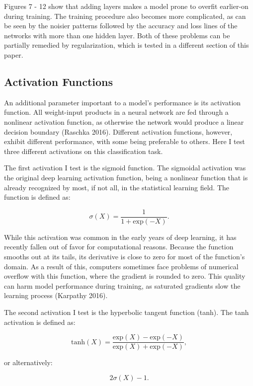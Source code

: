 \documentclass[12pt]{article}  %
\theoremstyle{definition}
\theoremstyle{remark}
\begin{document}
\par  Figures 7 - 12 show that adding layers makes a model prone to overfit earlier-on during training. The training procedure also becomes more complicated, as can be seen by the noisier patterns followed by the accuracy and loss lines of the networks with more than one hidden layer. Both of these problems can be partially remedied by regularization, which is tested in a different section of this paper. 

\subsection{Activation Functions}
\par An additional parameter important to a model's performance is its activation function. All weight-input products in a neural network are fed through a nonlinear activation function, as otherwise the network would produce a linear decision boundary (Raschka 2016). Different activation functions, however, exhibit different performance, with some being preferable to others. Here I test three different activations on this classification task.
\par The first activation I test is the sigmoid function. The sigmoidal activation was the original deep learning activation function, being a nonlinear function that is already recognized by most, if not all, in the statistical learning field. The function is defined as:

$$\sigma{(X)} = \frac{1}{1+\text{exp}(-X)}.$$

\par While this activation was common in the early years of deep learning, it has recently fallen out of favor for computational reasons. Because the function smooths out at its tails, its derivative is close to zero for most of the function's domain. As a result of this, computers sometimes face problems of numerical overflow with this function, where the gradient is rounded to zero. This quality can harm model performance during training, as saturated gradients slow the learning process (Karpathy 2016). 
\par The second activation I test is the hyperbolic tangent function (tanh). The tanh activation is defined as:

$$\text{tanh}(X)=\frac{\text{exp}(X)-\text{exp}(-X)}{\text{exp}(X)+\text{exp}(-X)}, $$

or alternatively:

$$ 2\sigma{(X)} - 1. $$
\end{document}
